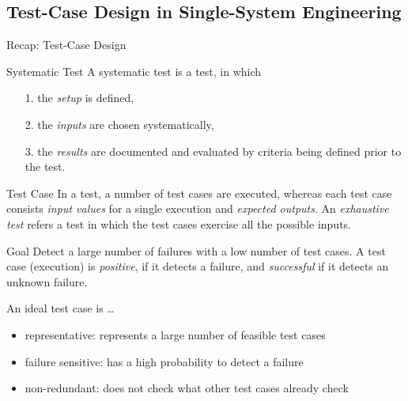 \subsection{Test-Case Design in Single-System Engineering}
\begin{frame}{Recap: Test-Case Design }
	\begin{mycolumns}
		\begin{definition}{Systematic Test \mysource{\ludewiglichter}}
			A systematic test is a test, in which
			\begin{itemize}
				\setlength\itemsep{.1em}
				\item[1.] the \emph{setup} is defined,
				\item[2.] the \emph{inputs} are chosen systematically,
				\item[3.] the \emph{results} are documented and evaluated by criteria being defined prior to the test. 
			\end{itemize}
		\end{definition}
		\pause
		\begin{definition}{Test Case \mysource{\ludewiglichter}}
			In a test, a number of test cases are executed, whereas each test case consists \emph{input values} for a single execution and \emph{expected outputs}. An \emph{exhaustive test} refers a test in which the test cases exercise all the possible inputs.
		\end{definition}
	\mynextcolumn
		\pause
		\begin{note}{Goal \mysource{\ludewiglichter}}%
			Detect a large number of failures with a low number of test cases. A test case (execution) is \emph{positive}, if it detects a failure, and \emph{successful} if it detects an unknown failure.
		\end{note}
		\pause
		\begin{definition}{An ideal test case is \ldots \mysource{\ludewiglichter}}
			\begin{itemize}
				\setlength\itemsep{.1em}
				\item representative: represents a large number of feasible test cases
				\item failure sensitive: has a high probability to detect a failure
				\item non-redundant: does not check what other test cases already check
			\end{itemize}
		\end{definition}
	\end{mycolumns}
\end{frame}

